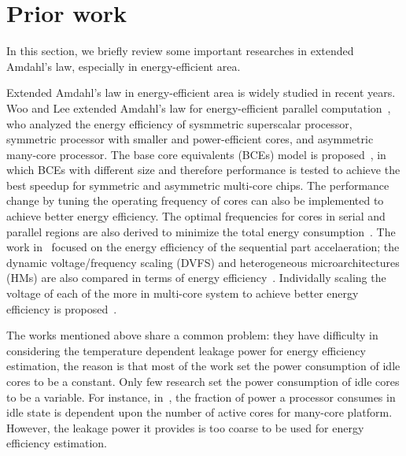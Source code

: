 \section{Prior work}
\label{sec:related_works}


In this section, we briefly review some important researches in extended Amdahl's law, especially in energy-efficient area.

Extended Amdahl's law in energy-efficient area is widely studied in recent years. Woo and Lee extended Amdahl's law for energy-efficient parallel computation~\cite{woo:Computer'08}, who analyzed the energy efficiency of sysmmetric superscalar processor, symmetric processor with smaller and power-efficient cores, and asymmetric many-core processor. The base core equivalents (BCEs) model is proposed~\cite{hill:Computer'08}, in which BCEs with different size and therefore performance is tested to achieve the best speedup for symmetric and asymmetric multi-core chips. The performance change by tuning the operating frequency of cores can also be implemented to achieve better energy efficiency. The optimal frequencies for cores in serial and parallel regions are also derived to minimize the total energy consumption~\cite{cho:CAL'08,wang:access'17}. The work in~\cite{kim:CAL'15} focused on the energy efficiency of the sequential part accelaeration; the dynamic voltage/frequency scaling (DVFS) and heterogeneous microarchitectures (HMs) are also compared in terms of energy efficiency~\cite{lukefahr:ICPAC'14}. Individally scaling the voltage of each of the more in multi-core system to achieve better energy efficiency is proposed~\cite{borkar:dac'07}.



The works mentioned above share a common problem: they have difficulty in considering the temperature dependent leakage power for energy efficiency estimation, the reason is that most of the work set the power consumption of idle cores to be a constant. Only few research set the power consumption of idle cores to be a variable. For instance, in~\cite{karanikolaou:JS'14}, the fraction of power a processor consumes in idle state is dependent upon the number of active cores for many-core platform. However, the leakage power it provides is too coarse to be used for energy efficiency estimation.


